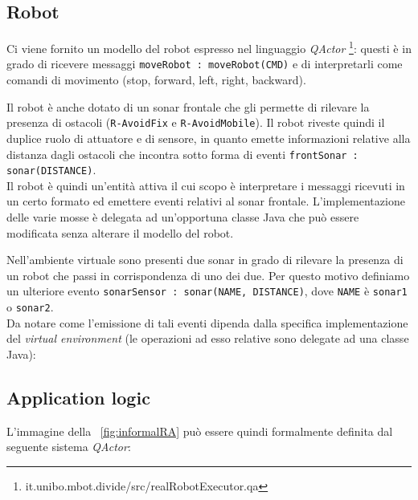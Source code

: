 \documentclass{../llncs}
\newcommand{\codescript}[1]{{\mbox{\small{\texttt{#1}}}}\xspace}
\newcommand{\code}[1]{{\color{blue}\small{\texttt{#1}}}}
\newcommand{\qa}{\textsf{\textit{QActor}}}
\newcommand{\xf}[1]{\figurename~\ref{fig:#1}}
\begin{document}


\subsection{Robot}
Ci viene fornito un modello del robot espresso nel linguaggio \qa
\footnote{it.unibo.mbot.divide/src/realRobotExecutor.qa}: questi è in grado di ricevere messaggi \codescript{moveRobot : moveRobot(CMD)} e di interpretarli come comandi di movimento (stop, forward, left, right, backward).

Il robot è anche dotato di un sonar frontale che gli permette di rilevare la presenza di ostacoli (\code{R-AvoidFix} e \code{R-AvoidMobile}). Il robot riveste quindi il duplice ruolo di attuatore e di sensore, in quanto emette informazioni relative alla distanza dagli ostacoli che incontra sotto forma di eventi \codescript{frontSonar : sonar(DISTANCE)}.\\

Il robot è quindi un'entità attiva il cui scopo è interpretare i messaggi ricevuti in un certo formato ed emettere eventi relativi al sonar frontale. L'implementazione delle varie mosse è delegata ad un'opportuna classe Java che può essere modificata senza alterare il modello del robot.\\



\vspace{8px}

Nell'ambiente virtuale sono presenti due sonar in grado di rilevare la presenza di un robot che passi in corrispondenza di uno dei due. Per questo motivo definiamo un ulteriore evento \codescript{sonarSensor : sonar(NAME, DISTANCE)}, dove \codescript{NAME} è \code{sonar1} o \code{sonar2}.\\

Da notare come l'emissione di tali eventi dipenda dalla specifica implementazione del \textit{virtual environment} (le operazioni ad esso relative sono delegate ad una classe Java):



\subsection{Application logic}
L'immagine della \xf{informalRA} può essere quindi formalmente definita dal seguente sistema {\qa}:\\
\end{document}
